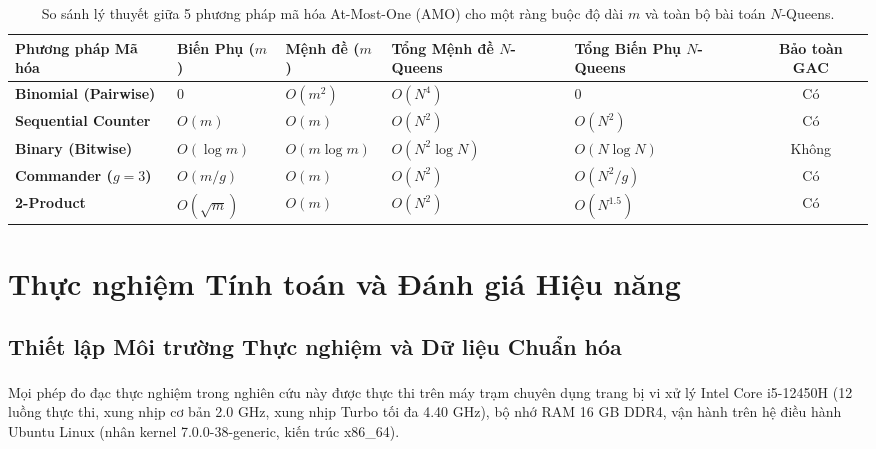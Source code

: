 \documentclass[a4paper,fleqn]{cas-sc}
\begin{document}
\begin{table}[htbp]
\centering
\caption{So sánh lý thuyết giữa 5 phương pháp mã hóa At-Most-One (AMO) cho một ràng buộc độ dài $m$ và toàn bộ bài toán $N$-Queens.}
\label{tab:encoding_theory}
\small
\begin{tabular*}{\tblwidth}{@{} LLLLLC @{}}
\toprule
\textbf{Phương pháp Mã hóa} & \textbf{Biến Phụ ($m$)} & \textbf{Mệnh đề ($m$)} & \textbf{Tổng Mệnh đề $N$-Queens} & \textbf{Tổng Biến Phụ $N$-Queens} & \textbf{Bảo toàn GAC} \\
\midrule
\textbf{Binomial (Pairwise)} & $0$ & $O(m^2)$ & $O(N^4)$ & $0$ & Có \\
\textbf{Sequential Counter} & $O(m)$ & $O(m)$ & $O(N^2)$ & $O(N^2)$ & Có \\
\textbf{Binary (Bitwise)} & $O(\log m)$ & $O(m \log m)$ & $O(N^2 \log N)$ & $O(N \log N)$ & Không \\
\textbf{Commander ($g=3$)} & $O(m/g)$ & $O(m)$ & $O(N^2)$ & $O(N^2 / g)$ & Có \\
\textbf{2-Product} & $O(\sqrt{m})$ & $O(m)$ & $O(N^2)$ & $O(N^{1.5})$ & Có \\
\bottomrule
\end{tabular*}
\end{table}

\section{Thực nghiệm Tính toán và Đánh giá Hiệu năng}
\label{sec:experiments}

\subsection{Thiết lập Môi trường Thực nghiệm và Dữ liệu Chuẩn hóa}
Mọi phép đo đạc thực nghiệm trong nghiên cứu này được thực thi trên máy trạm chuyên dụng trang bị vi xử lý Intel\textsuperscript{\textregistered} Core\texttrademark{} i5-12450H (12 luồng thực thi, xung nhịp cơ bản 2.0 GHz, xung nhịp Turbo tối đa 4.40 GHz), bộ nhớ RAM 16 GB DDR4, vận hành trên hệ điều hành Ubuntu Linux (nhân kernel 7.0.0-38-generic, kiến trúc x86\_64).
\end{document}
